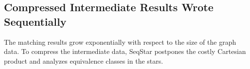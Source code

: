\subsection{Compressed Intermediate Results Wrote Sequentially}\label{sec:match_compress}
The matching results grow exponentially with respect to the size of the graph data.
To compress the intermediate data, SeqStar postpones the costly Cartesian product and analyzes equivalence classes in the stars.


